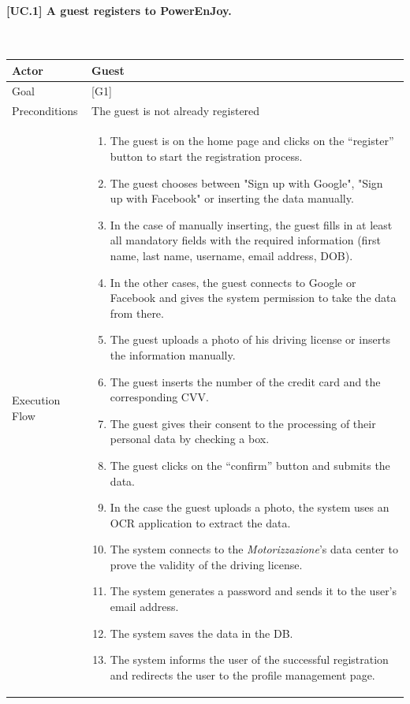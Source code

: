 \documentclass[english]{article}
\begin{document}
	\paragraph{[UC.1] A guest registers to PowerEnJoy.}
	~\\
	\begin{tabularx}{\textwidth}{  l  X  }
		\hline
		Actor & Guest\\
		\hline
		Goal & [G1]\\
		\hline
		Preconditions & The guest is not already registered\\
		\hline
		Execution Flow & \begin{enumerate}
			\item{The guest is on the home page and clicks on the “register” button to start the registration process.}
			\item{The guest chooses between "Sign up with Google", "Sign up with Facebook" or inserting the data manually.}
			\item{In the case of manually inserting, the guest fills in at least all mandatory fields with the required information (first name, last name, username, email address, DOB).}
			\item{In the other cases, the guest connects to Google or Facebook and gives the system permission to take the data from there.}
			\item{The guest uploads a photo of his driving license or inserts the information manually.}
			\item{The guest inserts the number of the credit card and the corresponding CVV}.
			\item{The guest gives their consent to the processing of their personal data by checking a box.}
			\item{The guest clicks on the “confirm” button and submits the data.}
			\item{In the case the guest uploads a photo, the system uses an OCR application to extract the data.}
			\item{The system connects to the \textit{Motorizzazione}'s data center to prove the validity of the driving license.}
			\item{The system generates a password and sends it to the user's email address.}
			\item{The system  saves the data in the DB.}
			\item{The system informs the user of the successful registration and redirects the user to the profile management page.}
		\end{enumerate}\\
		\hline
	\end{tabularx}
\end{document}
